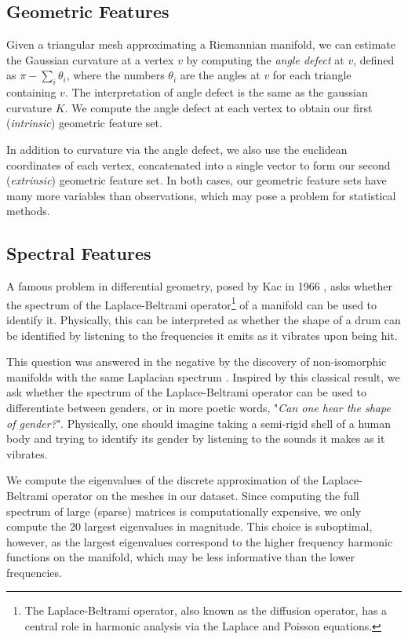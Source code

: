 \documentclass[11pt]{article}
\begin{document}
\subsection{Geometric Features}

Given a triangular mesh approximating a Riemannian manifold, we can estimate the Gaussian curvature at a vertex $v$ by computing the \textit{angle defect} at $v$, defined as $\pi - \sum_i \theta_i$, where the numbers $\theta_i$ are the angles at $v$ for each triangle containing $v$. The interpretation of angle defect is the same as the gaussian curvature $K$. We compute the angle defect at each vertex to obtain our first (\textit{intrinsic}) geometric feature set.

In addition to curvature via the angle defect, we also use the euclidean coordinates of each vertex, concatenated into a single vector to form our second (\textit{extrinsic}) geometric feature set. In both cases, our geometric feature sets have many more variables than observations, which may pose a problem for statistical methods.

\subsection{Spectral Features}

A famous problem in differential geometry, posed by Kac in 1966 \cite{Kac1966}, asks whether the spectrum of the Laplace-Beltrami operator\footnote{The Laplace-Beltrami operator, also known as the diffusion operator, has a central role in harmonic analysis via the Laplace and Poisson equations.} of a manifold can be used to identify it. Physically, this can be interpreted as whether the shape of a drum can be identified by listening to the frequencies it emits as it vibrates upon being hit.

This question was answered in the negative by the discovery of non-isomorphic manifolds with the same Laplacian spectrum \cite{Buser1994}. Inspired by this classical result, we ask whether the spectrum of the Laplace-Beltrami operator can be used to differentiate between genders, or in more poetic words, "\textit{Can one hear the shape of gender?}". Physically, one should imagine taking a semi-rigid shell of a human body and trying to identify its gender by listening to the sounds it makes as it vibrates.

We compute the eigenvalues of the discrete approximation of the Laplace-Beltrami operator on the meshes in our dataset. Since computing the full spectrum of large (sparse) matrices is computationally expensive, we only compute the 20 largest eigenvalues in magnitude. This choice is suboptimal, however, as the largest eigenvalues correspond to the higher frequency harmonic functions on the manifold, which may be less informative than the lower frequencies.
\end{document}
